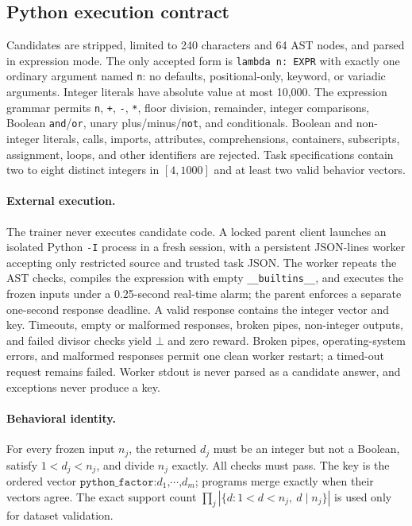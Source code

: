\subsection{Python execution contract}
\label{app:python}
\label{app:python-language}

Candidates are stripped, limited to 240 characters and 64 AST nodes, and
parsed in expression mode. The only accepted form is \texttt{lambda n: EXPR}
with exactly one ordinary argument named \texttt{n}: no defaults,
positional-only, keyword, or variadic arguments. Integer literals have
absolute value at most 10,000. The expression grammar permits \texttt{n},
\texttt{+}, \texttt{-}, \texttt{*}, floor division, remainder, integer
comparisons, Boolean \texttt{and}/\texttt{or}, unary plus/minus/\texttt{not},
and conditionals. Boolean and non-integer literals, calls, imports,
attributes, comprehensions, containers, subscripts, assignment, loops, and
other identifiers are rejected. Task specifications contain two to eight
distinct integers in $[4,1000]$ and at least two valid behavior vectors.

\paragraph{External execution.}
\label{app:python-process}
The trainer never executes candidate code. A locked parent client launches
an isolated Python \texttt{-I} process in a fresh session, with a persistent
JSON-lines worker accepting only restricted source and trusted task JSON.
The worker repeats the AST checks, compiles the expression with empty
\texttt{\_\_builtins\_\_}, and executes the frozen inputs under a
0.25-second real-time alarm; the parent enforces a separate one-second
response deadline. A valid response contains the integer vector and key.
Timeouts, empty or malformed responses, broken pipes, non-integer outputs,
and failed divisor checks yield $\bot$ and zero reward. Broken pipes,
operating-system errors, and malformed responses permit one clean worker
restart; a timed-out request remains failed. Worker stdout is never parsed
as a candidate answer, and exceptions never produce a key.

\paragraph{Behavioral identity.}
\label{app:python-identity}
For every frozen input $n_j$, the returned $d_j$ must be an integer but not a
Boolean, satisfy $1<d_j<n_j$, and divide $n_j$ exactly. All checks must pass.
The key is the ordered vector
$\texttt{python\_factor:}d_1\texttt{,}\cdots\texttt{,}d_m$;
programs merge exactly when their vectors agree. The exact support count
$\prod_j|\{d:1<d<n_j,\ d\mid n_j\}|$ is used only for dataset validation.

